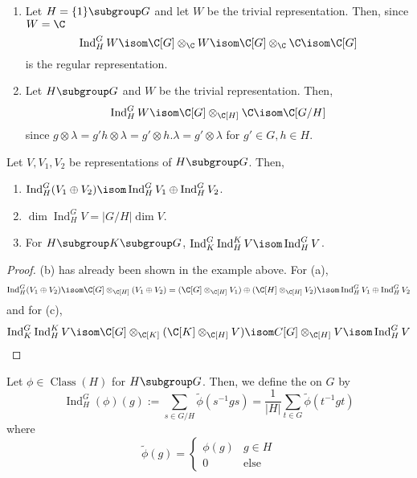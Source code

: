 \documentclass[11pt,leqno,oneside]{amsbook}
\newcommand{\Class}{\operatorname{Class}}
\newcommand{\Ind}{\operatorname{Ind}}
\numberwithin{thm}{section}
\begin{document}
\begin{example}
  \begin{enumerate}
  \item Let \(H = \{1\} \subgroup G\) and let \(W\) be the trivial
    representation. Then, since \(W = \C\) \[
      \Ind_H^G W \isom \C[G] \otimes_{\C} W \isom \C[G] \otimes_{\C}
      \C \isom \C[G]
    \]
    is the regular representation.
  \item Let \(H \subgroup G\) and \(W\) be the trivial
    representation. Then, \[
      \Ind_H^G W \isom \C[G] \otimes_{\C[H]} \C \isom \C[G/H]
    \]
    since \(g \otimes \lambda = g'h \otimes \lambda = g' \otimes
    h.\lambda = g' \otimes \lambda\) for \(g' \in G, h \in H\).
  \end{enumerate}
\end{example}
\begin{prop}
  Let \(V, V_1, V_2\) be representations of \(H \subgroup G\). Then, 
  \begin{enumerate}
  \item \(\Ind_H^G(V_1 \oplus V_2) \isom \Ind_H^G V_1 \oplus \Ind_H^G
    V_2\).
  \item \(\dim \Ind_H^G V = |G/H| \dim V\).
  \item For \(H \subgroup K \subgroup G\), \(\Ind_K^G \Ind_H^K V \isom
    \Ind_H^G V\).
  \end{enumerate}
\end{prop}
\begin{proof}
  (b) has already been shown in the example above. For (a), \[
    \Ind_H^G(V_1 \oplus V_2) \isom \C[G] \otimes_{\C[H]}(V_1 \oplus
    V_2)  = (\C[G] \otimes_{\C[H]} V_1) \oplus (\C[H] \otimes_{\C[H]}
    V_2) \isom \Ind_H^G V_1 \oplus \Ind_H^G V_2
  \]
  and for (c), \[
    \Ind_K^G \Ind_H^K V \isom \C[G] \otimes_{\C[K]} (\C[K] \otimes_{\C[H]} V) \isom C[G]
    \otimes_{\C[H]} V \isom \Ind_H^G V
  \]
\end{proof}
\begin{defn}
  Let \(\phi \in \Class(H)\) for \(H \subgroup G\). Then, we define
  the  on \(G\) by \[
    \Ind_H^G(\phi)(g) := \sum_{s \in G/H} \tilde{\phi}(s^{-1}gs) = \frac{1}{|H|}\sum_{t \in
    G} \tilde{\phi}(t^{-1}gt)
  \]
  where \[
    \tilde{\phi}(g) =
    \begin{cases}
      \phi(g) & g \in H \\
      0 & \text{else}
    \end{cases}
  \]
\end{defn}
\end{document}
